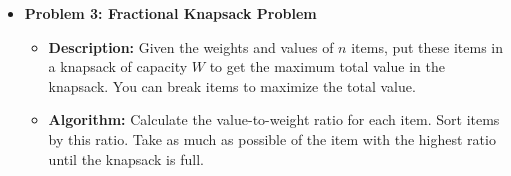 \documentclass[12pt]{book} %
\begin{document}
\begin{itemize}
    \begin{algorithm}
    \caption{Greedy Activity Selection Algorithm}
    \begin{algorithmic}[1]
    \Require A list of activities with their start and finish times $(s_1, f_1), (s_2, f_2), ..., (s_n, f_n)$ sorted by finish times.
    \Ensure The maximum number of non-overlapping activities.
    \State Let $A \leftarrow \emptyset$
    \State $A \leftarrow A \cup \{1\}$ 
    \State $j \leftarrow 1$
            \State $A \leftarrow A \cup \{i\}$
            \State $j \leftarrow i$
        \EndIf
    \EndFor
    \Return $A$
    \end{algorithmic}
    \end{algorithm}

    \FloatBarrier
    \begin{lstlisting}
def activity_selection(activities):
    activities.sort(key=lambda x: x[1])  # Sort by finish times
    selected_activities = [activities[0]]
    last_finish_time = activities[0][1]
    
    for start, finish in activities[1:]:
        if start >= last_finish_time:
            selected_activities.append((start, finish))
            last_finish_time = finish
            
    Return selected_activities

activities = [(1, 3), (2, 4), (3, 5), (0, 6), (5, 7), (8, 9), (5, 9)]
selected = activity_selection(activities)
print(f"Selected activities: {selected}")
    \end{lstlisting}
    \FloatBarrier

    \item \textbf{Problem 3: Fractional Knapsack Problem}
    \begin{itemize}
        \item \textbf{Description:} Given the weights and values of $n$ items, put these items in a knapsack of capacity $W$ to get the maximum total value in the knapsack. You can break items to maximize the total value.
        \item \textbf{Algorithm:} Calculate the value-to-weight ratio for each item. Sort items by this ratio. Take as much as possible of the item with the highest ratio until the knapsack is full.
    \end{itemize}


\end{itemize}
\end{document}
